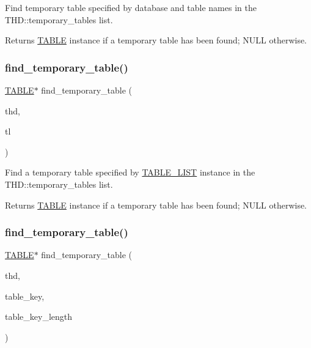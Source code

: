 Find temporary table specified by database and table names in the T\+H\+D\+::temporary\+\_\+tables list.

\begin{DoxyReturn}{Returns}
\mbox{\hyperlink{structTABLE}{T\+A\+B\+LE}} instance if a temporary table has been found; N\+U\+LL otherwise. 
\end{DoxyReturn}
\mbox{\label{group__Data__Dictionary_ga4d31aeecf54e9bf14d05fa8a6478b7e0}} 
\subsubsection{\texorpdfstring{find\+\_\+temporary\+\_\+table()}{find\_temporary\_table()}\hspace{0.1cm}{\footnotesize\ttfamily [2/3]}}
{\footnotesize\ttfamily \mbox{\hyperlink{structTABLE}{T\+A\+B\+LE}}$\ast$ find\+\_\+temporary\+\_\+table (\begin{DoxyParamCaption}\item[{T\+HD $\ast$}]{thd,  }\item[{const \mbox{\hyperlink{structTABLE__LIST}{T\+A\+B\+L\+E\+\_\+\+L\+I\+ST}} $\ast$}]{tl }\end{DoxyParamCaption})}

Find a temporary table specified by \mbox{\hyperlink{structTABLE__LIST}{T\+A\+B\+L\+E\+\_\+\+L\+I\+ST}} instance in the T\+H\+D\+::temporary\+\_\+tables list.

\begin{DoxyReturn}{Returns}
\mbox{\hyperlink{structTABLE}{T\+A\+B\+LE}} instance if a temporary table has been found; N\+U\+LL otherwise. 
\end{DoxyReturn}
\mbox{\label{group__Data__Dictionary_ga45eefb797fc5051da7202a1f96b20c1d}} 
\subsubsection{\texorpdfstring{find\+\_\+temporary\+\_\+table()}{find\_temporary\_table()}\hspace{0.1cm}{\footnotesize\ttfamily [3/3]}}
{\footnotesize\ttfamily \mbox{\hyperlink{structTABLE}{T\+A\+B\+LE}}$\ast$ find\+\_\+temporary\+\_\+table (\begin{DoxyParamCaption}\item[{T\+HD $\ast$}]{thd,  }\item[{const char $\ast$}]{table\+\_\+key,  }\item[{size\+\_\+t}]{table\+\_\+key\+\_\+length }\end{DoxyParamCaption})}

